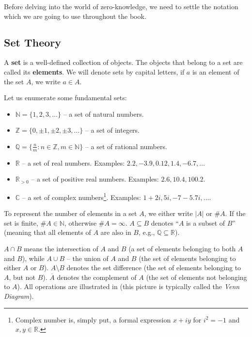 \documentclass[../../book.tex]{subfiles}
\begin{document}
Before delving into the world of zero-knowledge, we need to settle the notation
which we are going to use throughout the book. 

\subsection{Set Theory}

A \textbf{set} is a well-defined collection of objects. The objects that belong
to a set are called its \textbf{elements}. We will denote sets by capital
letters, if $a$ is an element of the set $A$, we write $a \in A$.

Let us enumerate some fundamental sets:

\begin{itemize}
    \item $\mathbb{N} = \{1, 2, 3, \dots\}$ -- a set of natural numbers.
    \item $\mathbb{Z} = \{0, \pm 1, \pm 2, \pm 3, \dots\}$ -- a set of integers.
    \item $\mathbb{Q} = \{\frac{n}{m}: n \in \mathbb{Z}, m \in \mathbb{N}\}$ -- a set of rational numbers.
    \item $\mathbb{R}$ -- a set of real numbers. Examples: $2.2, -3.9, 0.12, 1.4, -6.7, \dots$
    \item $\mathbb{R}_{>0}$ -- a set of positive real numbers. Examples: $2.6, 10.4, 100.2$.
    \item $\mathbb{C}$ -- a set of complex numbers\footnote{Complex number is, simply put, a formal expression $x+iy$ for $i^2=-1$ and $x,y \in \mathbb{R}$.}. 
    Examples: $1+2i, 5i, -7-5.7i, \dots$.
\end{itemize}

To represent the number of elements in a set $A$, we either write $|A|$ or $\#A$. If the set is finite, $\#A \in \mathbb{N}$, 
otherwise $\#A = \infty$. $A \subseteq B$ denotes ``$A$ is a subset of $B$'' (meaning that all elements of $A$ 
are also in $B$, e.g., $\mathbb{Q} \subseteq \mathbb{R}$).

$A \cap B$ means the intersection of $A$ and $B$ (a set of elements belonging to both $A$ and $B$), while 
$A \cup B$ -- the union of $A$ and $B$ (the set of elements belonging to either $A$ or $B$). $A \setminus B$ 
denotes the set difference (the set of elements belonging to $A$, but not $B$). $\overline{A}$ denotes the 
complement of $A$ (the set of elements not belonging to $A$). All operations are illustrated in 
 (this picture is typically called the \textit{Venn Diagram}).
\end{document}
